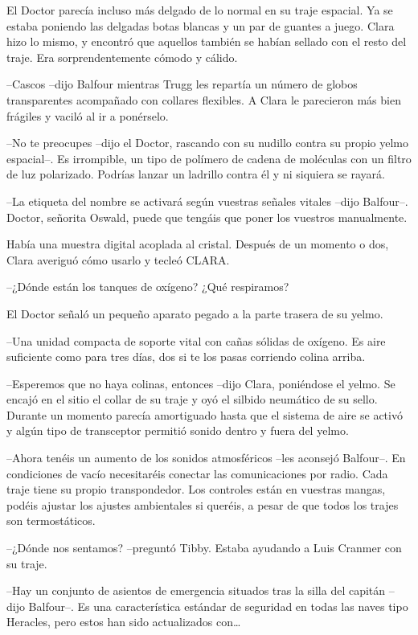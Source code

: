 {El Doctor parecía incluso más delgado de lo normal en su traje espacial.
 Ya se estaba poniendo las delgadas botas blancas y un par de guantes a
 juego. Clara hizo lo mismo, y encontró que aquellos también se habían
sellado con el resto del traje. Era sorprendentemente cómodo y cálido.}

{--Cascos --dijo Balfour mientras Trugg les repartía un número de globos
 transparentes acompañado con collares flexibles. A Clara le parecieron
más bien frágiles y vaciló al ir a ponérselo.}

{--No te preocupes --dijo el Doctor, rascando con su nudillo contra su
 propio yelmo espacial--. Es irrompible, un tipo de polímero de cadena de
 moléculas con un filtro de luz polarizado. Podrías lanzar un ladrillo
contra él y ni siquiera se rayará.}

{--La etiqueta del nombre se activará según vuestras señales vitales
 --dijo Balfour--. Doctor, señorita Oswald, puede que tengáis que poner
los vuestros manualmente.}

{Había una muestra digital acoplada al cristal. Después de un momento o
dos, Clara averiguó cómo usarlo y tecleó CLARA.}

{--¿Dónde están los tanques de oxígeno? ¿Qué respiramos?}

{El Doctor señaló un pequeño aparato pegado a la parte trasera de su
yelmo.}

{--Una unidad compacta de soporte vital con cañas sólidas de oxígeno. Es
 aire suficiente como para tres días, dos si te los pasas corriendo
colina arriba.}

{--Esperemos que no haya colinas, entonces --dijo Clara, poniéndose el
 yelmo. Se encajó en el sitio el collar de su traje y oyó el silbido
 neumático de su sello. Durante un momento parecía amortiguado hasta que
 el sistema de aire se activó y algún tipo de transceptor permitió sonido
dentro y fuera del yelmo.}

{--Ahora tenéis un aumento de los sonidos atmosféricos --les aconsejó
 Balfour--. En condiciones de vacío necesitaréis conectar las
 comunicaciones por radio. Cada traje tiene su propio transpondedor. Los
 controles están en vuestras mangas, podéis ajustar los ajustes
 ambientales si queréis, a pesar de que todos los trajes son
termostáticos.}

{--¿Dónde nos sentamos? --preguntó Tibby. Estaba ayudando a Luis Cranmer
con su traje.}

{--Hay un conjunto de asientos de emergencia situados tras la silla del
 capitán --dijo Balfour--. Es una característica estándar de seguridad en
 todas las naves tipo Heracles, pero estos han sido actualizados
 con\ldots{}}


